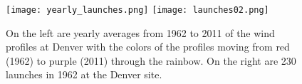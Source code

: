 \documentclass[12pt]{article}
\begin{document}
\clearpage





 \begin{figure}[h!]
\begin{center}
\texttt{[image: yearly\_launches.png]}
\texttt{[image: launches02.png]}
\caption{On the left are yearly averages from 1962 to 2011 of the wind profiles at Denver with the colors of the profiles moving from red (1962) to purple (2011) through the rainbow.  On the right are 230  launches in 1962 at the Denver site. }\label{fig:sample_launches}
\end{center}
\end{figure}
\end{document}
